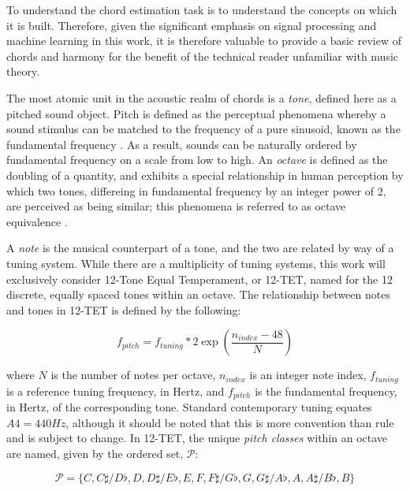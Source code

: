To understand the chord estimation task is to understand the concepts on which it is built.
Therefore, given the significant emphasis on signal processing and machine learning in this work, it is therefore valuable to provide a basic review of chords and harmony for the benefit of the technical reader unfamiliar with music theory.

The most atomic unit in the acoustic realm of chords is a \emph{tone}, defined here as a pitched sound object.
Pitch is defined as the perceptual phenomena whereby a sound stimulus can be matched to the frequency of a pure sinusoid, known as the fundamental frequency \cite{someguy}.
As a result, sounds can be naturally ordered by fundamental frequency on a scale from low to high.
An \emph{octave} is defined as the doubling of a quantity, and exhibits a special relationship in human perception by which two tones, differeing in fundamental frequency by an integer power of 2, are perceived as being similar; this phenomena is referred to as octave equivalence \cite{?}.

A \emph{note} is the musical counterpart of a tone, and the two are related by way of a tuning system.
While there are a multiplicity of tuning systems, this work will exclusively consider 12-Tone Equal Temperament, or 12-TET, named for the 12 discrete, equally spaced tones within an octave.
The relationship between notes and tones in 12-TET is defined by the following:

\begin{equation}
\label{eq:tuning}
f_{pitch} = f_{tuning} * 2 \exp(\frac{n_{index} - 48}{N})
\end{equation}

\noindent where $N$ is the number of notes per octave, $n_{index}$ is an integer note index, $f_{tuning}$ is a reference tuning frequency, in Hertz, and $f_{pitch}$ is the fundamental frequency, in Hertz, of the corresponding tone.
Standard contemporary tuning equates $A4=440Hz$, although it should be noted that this is more convention than rule and is subject to change.
In 12-TET, the unique \emph{pitch classes} within an octave are named, given by the ordered set, $\mathcal{P}$:

\begin{equation}
\label{eq:pitch_classes}
\mathcal{P} = \{C, C\sharp / D\flat, D, D\sharp / E\flat, E, F, F\sharp / G\flat, G, G\sharp / A\flat, A, A\sharp / B\flat, B\}
\end{equation}

